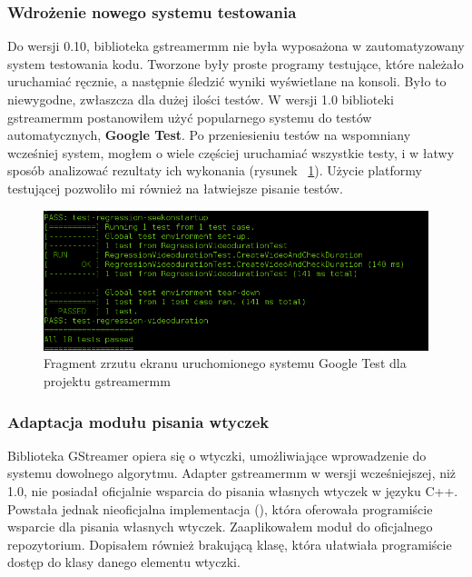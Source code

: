 \documentclass[12pt]{article}
\begin{document}
\subsubsection{Wdrożenie nowego systemu testowania}
Do wersji 0.10, biblioteka gstreamermm nie była wyposażona w zautomatyzowany system testowania kodu. Tworzone były proste programy testujące, które należało uruchamiać ręcznie, a następnie śledzić wyniki wyświetlane na konsoli. Było to niewygodne, zwłaszcza dla dużej ilości testów. W wersji 1.0 biblioteki gstreamermm postanowiłem użyć popularnego systemu do testów automatycznych, \textbf{Google Test}. Po przeniesieniu testów na wspomniany wcześniej system, mogłem o wiele częściej uruchamiać wszystkie testy, i w łatwy sposób analizować rezultaty ich wykonania (rysunek ~\ref{fig:gtestScreen}). Użycie platformy testującej pozwoliło mi również na łatwiejsze pisanie testów.
\begin{figure}[H]
  \includegraphics[width=150mm]{img/gtest-screen.png}
  \caption{Fragment zrzutu ekranu uruchomionego systemu Google Test dla projektu gstreamermm}
  \label{fig:gtestScreen}
\end{figure}
\subsubsection{Adaptacja modułu pisania wtyczek}
Biblioteka GStreamer opiera się o wtyczki, umożliwiające wprowadzenie do systemu dowolnego algorytmu. Adapter gstreamermm w wersji wcześniejszej, niż 1.0, nie posiadał oficjalnie wsparcia do pisania własnych wtyczek w języku C++. Powstała jednak nieoficjalna implementacja (\cite{pepergithub}), która oferowała programiście wsparcie dla pisania własnych wtyczek. Zaaplikowałem moduł do oficjalnego repozytorium. Dopisałem również brakującą klasę, która ułatwiała programiście dostęp do klasy danego elementu wtyczki.
\end{document}
